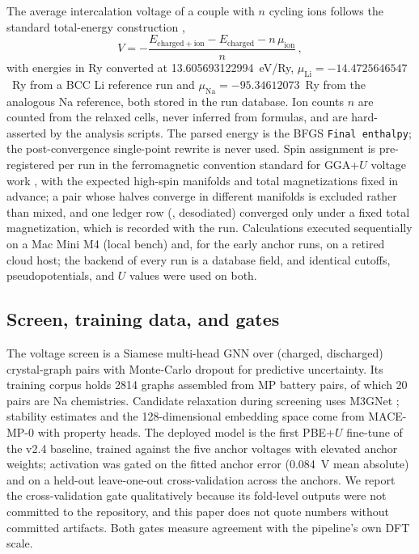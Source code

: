 \documentclass[reprint,aps,prb,amsmath,amssymb,nofootinbib,longbibliography]{revtex4-2}
\begin{document}
The average intercalation voltage of a couple with $n$ cycling ions follows
the standard total-energy construction \cite{aydinol1997},
\begin{equation}
\label{eq:voltage}
V = -\frac{E_{\mathrm{charged+ion}} - E_{\mathrm{charged}} - n\,\mu_{\mathrm{ion}}}
{n}\,,
\end{equation}
with energies in Ry converted at 13.605693122994~eV/Ry,
$\mu_{\mathrm{Li}} = -14.4725646547$~Ry from a BCC Li reference run
and $\mu_{\mathrm{Na}} = -95.34612073$~Ry from the analogous Na
reference, both stored in the run database. Ion counts $n$ are counted from
the relaxed cells, never inferred from formulas, and are hard-asserted by
the analysis scripts. The parsed energy is the BFGS \texttt{Final enthalpy};
the post-convergence single-point rewrite is never used. Spin assignment is
pre-registered per run in the ferromagnetic convention standard for GGA+$U$
voltage work \cite{wang2006}, with the expected high-spin manifolds and
total magnetizations fixed in advance; a pair whose halves converge in
different manifolds is excluded rather than mixed, and one ledger row
(, desodiated) converged only under a fixed total
magnetization, which is recorded with the run. Calculations executed
sequentially on a Mac Mini M4 (local bench) and, for the early anchor runs,
on a retired cloud host; the backend of every run is a database field, and
identical cutoffs, pseudopotentials, and $U$ values were used on both.

\subsection{Screen, training data, and gates}
The voltage screen is a Siamese multi-head GNN over (charged, discharged)
crystal-graph pairs with Monte-Carlo dropout for predictive uncertainty.
Its training corpus holds 2814 graphs assembled from MP battery pairs, of
which 20 pairs are Na chemistries. Candidate relaxation during screening
uses M3GNet \cite{chen2022}; stability estimates and the 128-dimensional
embedding space come from MACE-MP-0 \cite{batatia2022,batatia2024} with
property heads. The deployed model is the first PBE+$U$ fine-tune of the
v2.4 baseline, trained against the five anchor voltages with elevated
anchor weights; activation was gated on the fitted anchor error
(\SI{0.084}{\volt} mean absolute) and on a held-out leave-one-out
cross-validation across the anchors. We report the cross-validation gate
qualitatively because its fold-level outputs were not committed to the
repository, and this paper does not quote numbers without committed
artifacts. Both gates measure agreement with the pipeline's own DFT scale.
\end{document}
